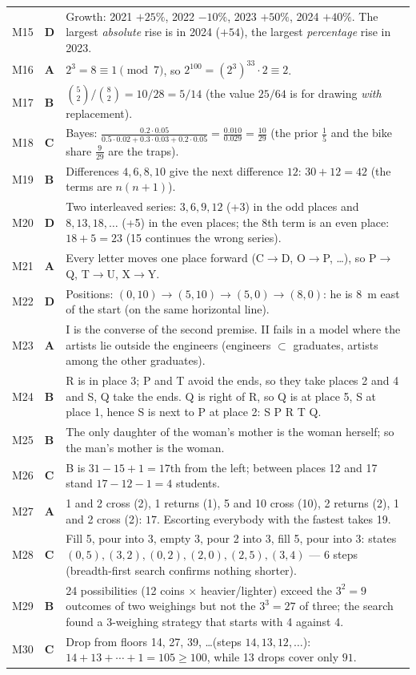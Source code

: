 \documentclass[10pt,a4paper,openany,oneside]{report}
\begin{document}
\begin{center}
\begin{xltabular}{\textwidth}{@{}L{0.95cm}L{0.7cm}Y@{}}
M15 & \textbf{D} & Growth: 2021 $+25\%$, 2022 $-10\%$, 2023 $+50\%$, 2024 $+40\%$. The largest \emph{absolute} rise is in 2024 ($+54$), the largest \emph{percentage} rise in 2023.\\
M16 & \textbf{A} & $2^3=8\equiv1\pmod7$, so $2^{100}=(2^3)^{33}\cdot2\equiv2$.\\
M17 & \textbf{B} & $\binom52/\binom82=10/28=5/14$ (the value $25/64$ is for drawing \emph{with} replacement).\\
M18 & \textbf{C} & Bayes: $\frac{0.2\cdot0.05}{0.5\cdot0.02+0.3\cdot0.03+0.2\cdot0.05}=\frac{0.010}{0.029}=\frac{10}{29}$ (the prior $\frac15$ and the bike share $\frac9{29}$ are the traps).\\
M19 & \textbf{B} & Differences $4,6,8,10$ give the next difference $12$: $30+12=42$ (the terms are $n(n+1)$).\\
M20 & \textbf{D} & Two interleaved series: $3,6,9,12$ (+3) in the odd places and $8,13,18,\ldots$ (+5) in the even places; the 8th term is an even place: $18+5=23$ (15 continues the wrong series).\\
M21 & \textbf{A} & Every letter moves one place forward (C$\to$D, O$\to$P, \ldots), so P$\to$Q, T$\to$U, X$\to$Y.\\
M22 & \textbf{D} & Positions: $(0,10)\to(5,10)\to(5,0)\to(8,0)$: he is $8$~m east of the start (on the same horizontal line).\\
M23 & \textbf{A} & I is the converse of the second premise. II fails in a model where the artists lie outside the engineers (engineers $\subset$ graduates, artists among the other graduates).\\
M24 & \textbf{B} & R is in place 3; P and T avoid the ends, so they take places 2 and 4 and S, Q take the ends. Q is right of R, so Q is at place 5, S at place 1, hence S is next to P at place 2: S P R T Q.\\
M25 & \textbf{B} & The only daughter of the woman's mother is the woman herself; so the man's mother is the woman.\\
M26 & \textbf{C} & B is $31-15+1=17$th from the left; between places 12 and 17 stand $17-12-1=4$ students.\\
M27 & \textbf{A} & 1 and 2 cross (2), 1 returns (1), 5 and 10 cross (10), 2 returns (2), 1 and 2 cross (2): $17$. Escorting everybody with the fastest takes 19.\\
M28 & \textbf{C} & Fill 5, pour into 3, empty 3, pour 2 into 3, fill 5, pour into 3: states $(0,5),(3,2),(0,2),(2,0),(2,5),(3,4)$ --- 6 steps (breadth-first search confirms nothing shorter).\\
M29 & \textbf{B} & 24 possibilities (12 coins $\times$ heavier/lighter) exceed the $3^2=9$ outcomes of two weighings but not the $3^3=27$ of three; the search found a 3-weighing strategy that starts with 4 against 4.\\
M30 & \textbf{C} & Drop from floors 14, 27, 39, \ldots (steps $14,13,12,\ldots$): $14+13+\cdots+1=105\ge100$, while 13 drops cover only $91$.\\
\bottomrule
\end{xltabular}
\end{center}
\end{document}
